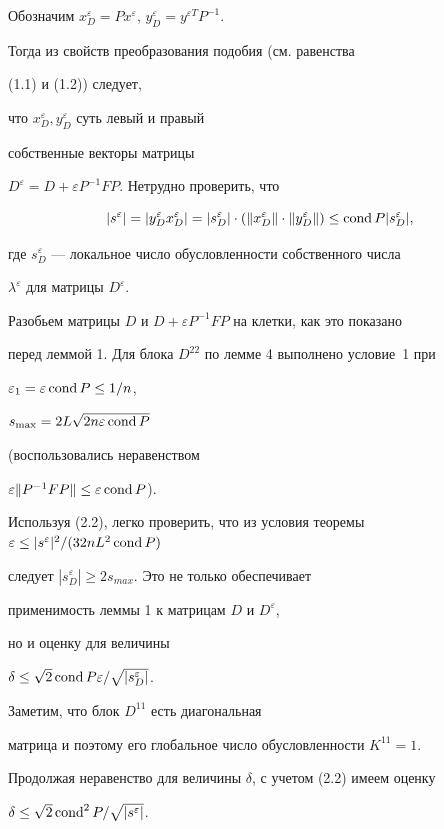 \begin{pf}


Обозначим $x^{\varepsilon}_D=Px^{\varepsilon}$, $y^{\varepsilon}_D


=y^{\varepsilon T} P^{-1}$.


Тогда из свойств преобразования подобия (см. равенства


(1.1) и (1.2)) следует,


что $x^{\varepsilon}_D, y^{\varepsilon}_D$ суть левый и правый


собственные векторы матрицы


$D^{\varepsilon}=D+\varepsilon P^{-1}FP$. Нетрудно проверить, что


\begin{equation}


|s^{\varepsilon}|=|y^{\varepsilon}_D x^{\varepsilon}_D|=


|s^{\varepsilon}_D|\cdot(


\|x^{\varepsilon}_D\|\cdot\|y^{\varepsilon}_D\|)\le


\cond P |s_D^{\varepsilon}|,


\end{equation}


где $s^{\varepsilon}_D$ --- локальное число обусловленности собственного числа


$\lambda^{\varepsilon}$ для матрицы $D^{\varepsilon}$.





Разобьем матрицы $D$ и $D+\varepsilon P^{-1} F P$ на клетки, как это показано


перед леммой 1. Для блока $D^{22}$ по лемме 4 выполнено условие~1 при


$\varepsilon_1=\varepsilon \operatorname{cond} P\le 1/n$,


$s_{\max}=2L\sqrt{2 n\varepsilon \operatorname{cond} P}$


(воспользовались неравенством


$\varepsilon \|P^{-1}F P\|\le \varepsilon \operatorname{cond} P$).





Используя (2.2), легко проверить, что из условия теоремы $\varepsilon\le


|s^{\varepsilon}|^2/(32 n L^2 \cond P)$


следует $|s^{\varepsilon}_D|\ge 2 s_{max}$. Это не только обеспечивает


применимость леммы 1 к матрицам $D$ и $D^{\varepsilon}$,


но и оценку для величины


$\delta\le \sqrt{2}\operatorname{cond} P \varepsilon /\sqrt{|s^{\varepsilon}_D|}$.


Заметим, что блок $D^{11}$ есть диагональная


матрица и поэтому его глобальное число обусловленности $K^{11}=1$.


Продолжая неравенство для величины $\delta$, с учетом (2.2) имеем оценку


$\delta\le \sqrt{2} \operatorname{cond}^2 P/\sqrt{|s^{\varepsilon}|}$.


\end{pf}





